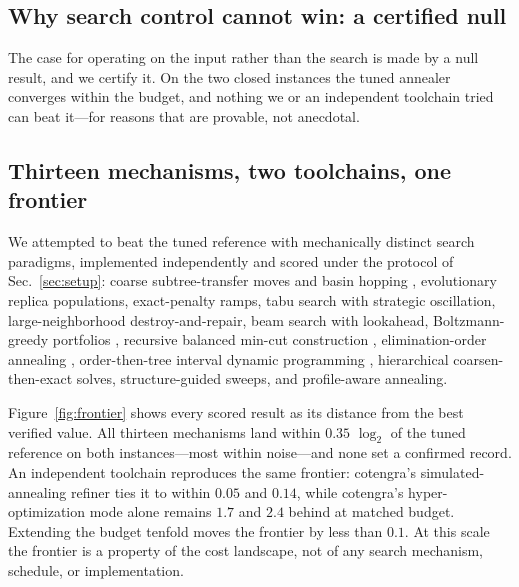 \documentclass{SciPost}
\begin{document}
\begin{appendix}

\section{Why search control cannot win: a certified null}
\label{app:null}
\label{sec:null}

The case for operating on the input rather than the search is made by a
null result, and we certify it. On the two closed instances the tuned
annealer converges within the budget, and nothing we or an independent
toolchain tried can beat it---for reasons that are provable, not
anecdotal.

\subsection{Thirteen mechanisms, two toolchains, one frontier}
\label{sec:frontier}

We attempted to beat the tuned reference with mechanically distinct
search paradigms, implemented independently and scored under the protocol
of Sec.~\ref{sec:setup}: coarse subtree-transfer moves and basin hopping
\cite{geiger_2025_optimizing}, evolutionary replica populations,
exact-penalty ramps, tabu search with strategic oscillation,
large-neighborhood destroy-and-repair, beam search with lookahead,
Boltzmann-greedy portfolios \cite{gray_2020_hyper, orgler_2024_optimizing},
recursive balanced min-cut construction \cite{strasser_2017_computing,
staudt_2024_improved}, elimination-order annealing
\cite{dumitrescu_2018_benchmarking}, order-then-tree interval dynamic
programming \cite{ibrahim_2022_constructing}, hierarchical
coarsen-then-exact solves, structure-guided sweeps, and profile-aware
annealing.

Figure~\ref{fig:frontier} shows every scored result as its distance from
the best verified value. All thirteen mechanisms land within $0.35$
$\log_2$ of the tuned reference on both instances---most within
noise---and none set a confirmed record. An independent toolchain
reproduces the same frontier: cotengra's simulated-annealing refiner
\cite{gray_2020_hyper} ties it to within $0.05$ and $0.14$, while
cotengra's hyper-optimization mode alone remains $1.7$ and $2.4$ behind
at matched budget. Extending the budget tenfold moves the frontier by
less than $0.1$. At this scale the frontier is a property of the cost
landscape, not of any search mechanism, schedule, or implementation.


\end{appendix}
\end{document}
